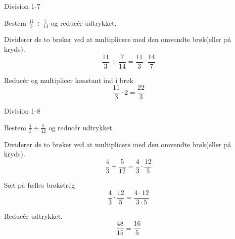 \documentclass{article}
\begin{document}
\newpage

\begin{exercise}{Division 1-7}

Bestem $\frac{11}{3} \div \frac{7}{14}$ og reducér udtrykket.


\hint

Dividerer de to brøker ved at multiplicere med den omvendte brøk(eller på kryds).
\[
\frac{11}{3} \div \frac{7}{14} = \frac{11}{3} \cdot \frac{14}{7}
\]

\hint

Reducér og multiplicer konstant ind i brøk
\[
\frac{11}{3} \cdot 2 = \frac{22}{3}
\]


\end{exercise}

\newpage

\begin{exercise}{Division 1-8}

Bestem $\frac{4}{3} \div \frac{5}{12}$ og reducér udtrykket.


\hint

Dividerer de to brøker ved at multiplicere med den omvendte brøk(eller på kryds).
\[
\frac{4}{3} \div \frac{5}{12} = \frac{4}{3} \cdot \frac{12}{5}
\]

\hint

Sæt på fælles brøkstreg
\[
\frac{4}{3} \cdot \frac{12}{5} = \frac{4 \cdot 12}{3 \cdot 5}
\]

\hint

Reducér udtrykket.
\[
\frac{48}{15} = \frac{16}{5}
\]

\end{exercise}
\end{document}
